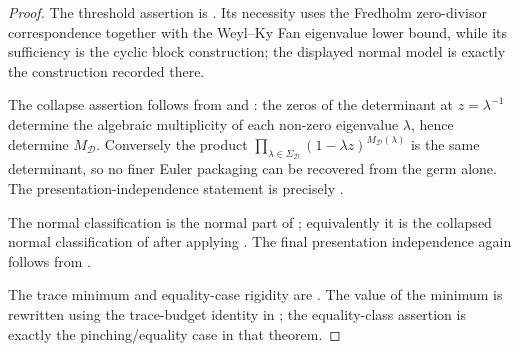 \begin{proof}
  The threshold assertion is . Its
  necessity uses the Fredholm zero-divisor correspondence together with the
  Weyl--Ky Fan eigenvalue lower bound, while its sufficiency is the cyclic
  block construction; the displayed normal model is exactly the construction
  recorded there.

  The collapse assertion follows from
   and
  : the zeros of the determinant at
  \(z=\lambda^{-1}\) determine the algebraic multiplicity of each non-zero
  eigenvalue \(\lambda\), hence determine \(M_{\mathcal D}\). Conversely the
  product
  \(\prod_{\lambda\in\Sigma_{\mathcal D}}(1-\lambda z)^{M_{\mathcal D}(\lambda)}\)
  is the same determinant, so no finer Euler packaging can be recovered from
  the germ alone. The presentation-independence statement is precisely
  .

  The normal classification is the normal part of
  ; equivalently it is the collapsed
  normal classification of
   after applying
  . The final presentation
  independence again follows from .

  The trace minimum and equality-case rigidity are
  . The value of the minimum is
  rewritten using the trace-budget identity in
  ; the equality-class assertion
  is exactly the pinching/equality case in that theorem.
\end{proof}

